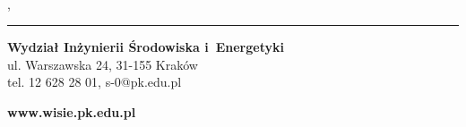 \begin{flushright}
  \\[2pt]
  {\fontsize{11.5}{14}\selectfont\bfseries{}}
\end{flushright}

\begin{center}
  {\fontsize{11.5}{14}\selectfont{}, }
\end{center}

{\color{wisieniebieski}\rule{\linewidth}{0.4pt}}\par
\vspace{2.5mm}
\begin{minipage}[b]{0.62\linewidth}
  \fontsize{7.5}{9.5}\selectfont
  {\bfseries\color{pkgranat}Wydział Inżynierii Środowiska i~Energetyki}\\
  ul. Warszawska 24, 31-155 Kraków\\
  tel. 12 628 28 01, s-0@pk.edu.pl
\end{minipage}\hfill
\begin{minipage}[b]{0.36\linewidth}
  \raggedleft\fontsize{11}{13}\selectfont\bfseries\color{wisieniebieski}%
  www.wisie.pk.edu.pl
\end{minipage}\par
\endgroup
\restoregeometry
\cleardoublepage
